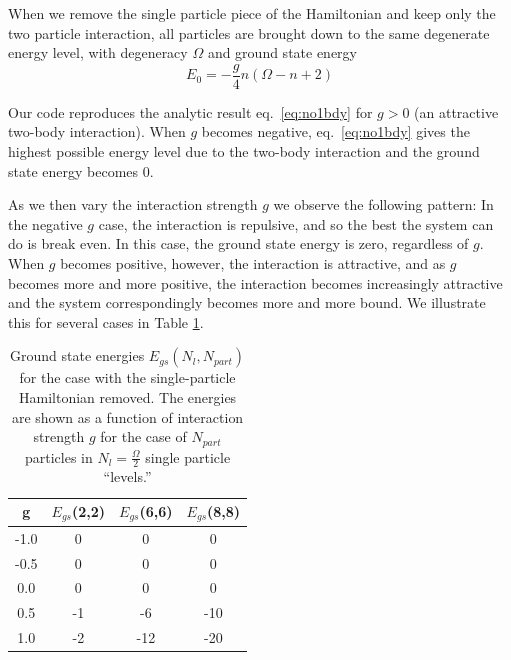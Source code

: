 \documentclass[11pt]{article}
\begin{document}
When we remove the single particle piece of the Hamiltonian and keep only
the two particle interaction, all particles are brought down to the same
degenerate energy level, with degeneracy $\Omega$ and ground state energy
\begin{equation}
	E_0 = - \frac{g}{4} n (\Omega - n +2)
	\label{eq:no1bdy}
\end{equation}

Our code reproduces the analytic result eq.~\ref{eq:no1bdy} for $g>0$ (an attractive two-body interaction). When 
$g$ becomes negative, eq.~\ref{eq:no1bdy} gives the highest possible energy level due to the two-body interaction
and the ground state energy becomes 0.

As we then vary the
interaction strength $g$ we observe the following pattern: In the
negative $g$ case, the interaction is repulsive, and so the best the
system can do is break even. In this case, the ground state energy is
zero, regardless of $g$. When $g$ becomes positive, however, the
interaction is attractive, and as $g$ becomes more and more positive,
the interaction becomes increasingly attractive and the system
correspondingly becomes more and more bound. We illustrate this for
several cases in Table \ref{tab:data-nosinglepart}.

\begin{table}
\begin{center}
\begin{tabular}{|c|c|c|c|}
\hline
   g   &  $E_{gs}$(2,2)  &  $E_{gs}$(6,6)  & $ E_{gs}$(8,8) \\ \hline
-1.0  &  0  &  0  &  0   \\
-0.5  &  0  &  0  &  0   \\
  0.0  &  0  &  0  &  0   \\
  0.5  &  -1  & -6  &  -10 \\
  1.0  &  -2  & -12 &  -20 \\
\hline
\end{tabular}
\end{center}
\caption{Ground state energies $E_{gs}(N_l,N_{part})$ for the case with
the single-particle Hamiltonian removed. The energies are shown as a
function of interaction strength $g$ for the case of $N_{part}$
particles in $N_l=\frac{\Omega}{2}$ single particle ``levels.''}
\label{tab:data-nosinglepart}
\end{table}

\clearpage

\end{document}
